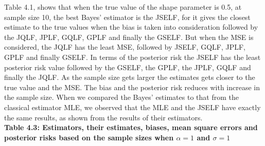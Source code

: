 \documentclass[a4paper,12pt]{report}
\begin{document}
{\normalfont\indent Table 4.1, shows that when the true value of the shape parameter is 0.5, at sample size 10, the best Bayes’ estimator is the JSELF, for it gives the closest estimate to the true values when the bias is taken into consideration followed by the JQLF, JPLF, GQLF, GPLF and finally the GSELF. But when the MSE is considered, the JQLF has the least MSE, followed by JSELF, GQLF, JPLF, GPLF and finally GSELF. In terms of the posterior risk the JSELF has the least posterior risk value followed by the GSELF, the GPLF, the JPLF, GQLF and finally the JQLF.
As the sample size gets larger the estimates gets closer to the true value and the MSE. The bias and the posterior risk reduces with increase in the sample size. When we compared the Bayes’ estimates to that from the classical estimator MLE, we observed that the MLE and the JSELF have exactly the same results, as shown from the results of their estimators.\\
}
\newpage
\noindent \textbf{Table 4.3: Estimators, their estimates, biases, mean square errors and posterior risks based on the sample sizes when $\alpha=1$ and $\sigma=1$}\vspace{1cm}\\
\end{document}
